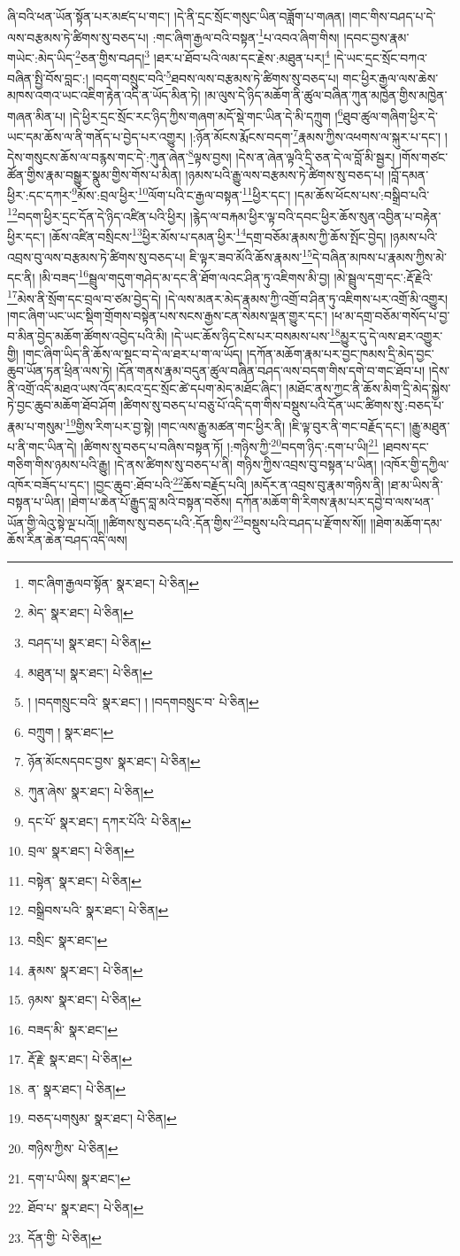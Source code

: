 ཞི་བའི་ཕན་ཡོན་སྟོན་པར་མཛད་པ་གང་། །དེ་ནི་དྲང་སྲོང་གསུང་ཡིན་བཟློག་པ་གཞན། །གང་གིས་བཤད་པ་དེ་ལས་བརྩམས་ཏེ་ཚིགས་སུ་བཅད་པ། :གང་ཞིག་རྒྱལ་བའི་བསྟན་\footnote{གང་ཞིག་རྒྱལབ་སྟོན་  སྣར་ཐང་།  པེ་ཅིན། }པ་འབའ་ཞིག་གིས། །དབང་བྱས་རྣམ་གཡེང་:མེད་ཡིད་\footnote{མེད་  སྣར་ཐང་།  པེ་ཅིན། }ཅན་གྱིས་བཤད།\footnote{བཤད་པ།  སྣར་ཐང་།  པེ་ཅིན། } །ཐར་པ་ཐོབ་པའི་ལམ་དང་རྗེས་:མཐུན་པར།\footnote{མཐུན་པ།  སྣར་ཐང་།  པེ་ཅིན། } །དེ་ཡང་དྲང་སྲོང་བཀའ་བཞིན་སྤྱི་བོས་བླང་:། །བདག་བསྲུང་བའི་\footnote{། །བདགསྲུང་བའི་  སྣར་ཐང་། ། །བདགབསྲུང་བ་  པེ་ཅིན། }ཐབས་ལས་བརྩམས་ཏེ་ཚིགས་སུ་བཅད་པ། གང་ཕྱིར་རྒྱལ་ལས་ཆེས་མཁས་འགའ་ཡང་འཇིག་རྟེན་འདི་ན་ཡོད་མིན་ཏེ། །མ་ལུས་དེ་ཉིད་མཆོག་ནི་ཚུལ་བཞིན་ཀུན་མཁྱེན་གྱིས་མཁྱེན་གཞན་མིན་པ། །དེ་ཕྱིར་དྲང་སྲོང་རང་ཉིད་ཀྱིས་གཞག་མདོ་སྡེ་གང་ཡིན་དེ་མི་དཀྲུག །\footnote{བཀྲུག །  སྣར་ཐང་། }ཐུབ་ཚུལ་གཞིག་ཕྱིར་དེ་ཡང་དམ་ཆོས་ལ་ནི་གནོད་པ་བྱེད་པར་འགྱུར། །:ཉོན་མོངས་རྨོངས་བདག་\footnote{ཉོན་མོངསདབང་བྱས་  སྣར་ཐང་།  པེ་ཅིན། }རྣམས་ཀྱིས་འཕགས་ལ་སྐུར་པ་དང་། །དེས་གསུངས་ཆོས་ལ་བརྙས་གང་དེ་:ཀུན་ཞེན་\footnote{ཀུན་ཞེས་  སྣར་ཐང་།  པེ་ཅིན། }ལྟས་བྱས། །དེས་ན་ཞེན་ལྟའི་དྲི་ཅན་དེ་ལ་བློ་མི་སྦྱར། །གོས་གཙང་ཚོན་གྱིས་རྣམ་བསྒྱུར་སྣུམ་གྱིས་གོས་པ་མིན། །ཉམས་པའི་རྒྱུ་ལས་བརྩམས་ཏེ་ཚིགས་སུ་བཅད་པ། །བློ་དམན་ཕྱིར་:དང་དཀར་\footnote{དང་པོ་  སྣར་ཐང་། དཀར་པོའི་  པེ་ཅིན། }མོས་:བྲལ་ཕྱིར་\footnote{བྲལ་  སྣར་ཐང་།  པེ་ཅིན། }ལོག་པའི་ང་རྒྱལ་བསྟན་\footnote{བསྟེན་  སྣར་ཐང་།  པེ་ཅིན། }ཕྱིར་དང་། །དམ་ཆོས་ཕོངས་པས་:བསྒྲིབ་པའི་\footnote{བསྒྲིབས་པའི་  སྣར་ཐང་།  པེ་ཅིན། }བདག་ཕྱིར་དྲང་དོན་དེ་ཉིད་འཛིན་པའི་ཕྱིར། །རྙེད་ལ་བརྐམ་ཕྱིར་ལྟ་བའི་དབང་ཕྱིར་ཆོས་སུན་འབྱིན་པ་བརྟེན་ཕྱིར་དང་། །ཆོས་འཛིན་བསྲིངས་\footnote{བསྲིང་  སྣར་ཐང་། }ཕྱིར་མོས་པ་དམན་ཕྱིར་\footnote{རྣམས་  སྣར་ཐང་།  པེ་ཅིན། }དགྲ་བཅོམ་རྣམས་ཀྱི་ཆོས་སྤོང་བྱེད། །ཉམས་པའི་འབྲས་བུ་ལས་བརྩམས་ཏེ་ཚིགས་སུ་བཅད་པ། ཇི་ལྟར་ཟབ་མོའི་ཆོས་རྣམས་\footnote{ཉམས་  སྣར་ཐང་།  པེ་ཅིན། }དེ་བཞིན་མཁས་པ་རྣམས་ཀྱིས་མེ་དང་ནི། །མི་བཟད་\footnote{བཟད་མི་  སྣར་ཐང་། }སྦྲུལ་གདུག་གཤེད་མ་དང་ནི་ཐོག་ལའང་ཤིན་ཏུ་འཇིགས་མི་བྱ། །མེ་སྦྲུལ་དགྲ་དང་:རྡོ་རྗེའི་\footnote{རྡོ་རྗེ་  སྣར་ཐང་།  པེ་ཅིན། }མེས་ནི་སྲོག་དང་བྲལ་བ་ཙམ་བྱེད་དེ། །དེ་ལས་མནར་མེད་རྣམས་ཀྱི་འགྲོ་བ་ཤིན་ཏུ་འཇིགས་པར་འགྲོ་མི་འགྱུར། །གང་ཞིག་ཡང་ཡང་སྡིག་གྲོགས་བསྟེན་པས་སངས་རྒྱས་ངན་སེམས་ལྡན་གྱུར་དང་། །ཕ་མ་དགྲ་བཅོམ་གསོད་པ་བྱ་བ་མིན་བྱེད་མཆོག་ཚོགས་འབྱེད་པའི་མི། །དེ་ཡང་ཆོས་ཉིད་ངེས་པར་བསམས་པས་\footnote{ན་  སྣར་ཐང་།  པེ་ཅིན། }མྱུར་དུ་དེ་ལས་ཐར་འགྱུར་གྱི། །གང་ཞིག་ཡིད་ནི་ཆོས་ལ་སྡང་བ་དེ་ལ་ཐར་པ་ག་ལ་ཡོད། །དཀོན་མཆོག་རྣམ་པར་བྱང་ཁམས་དྲི་མེད་བྱང་ཆུབ་ཡོན་ཏན་ཕྲིན་ལས་ཏེ། །དོན་གནས་རྣམ་བདུན་ཚུལ་བཞིན་བཤད་ལས་བདག་གིས་དགེ་བ་གང་ཐོབ་པ། །དེས་ནི་འགྲོ་འདི་མཐའ་ཡས་འོད་མངའ་དྲང་སྲོང་ཚེ་དཔག་མེད་མཐོང་ཞིང་། །མཐོང་ནས་ཀྱང་ནི་ཆོས་མིག་དྲི་མེད་སྐྱེས་ཏེ་བྱང་ཆུབ་མཆོག་ཐོབ་ཤོག །ཚིགས་སུ་བཅད་པ་བཅུ་པོ་འདི་དག་གིས་བསྡུས་པའི་དོན་ཡང་ཚིགས་སུ་:བཅད་པ་རྣམ་པ་གསུམ་\footnote{བཅད་པགསུམ་  སྣར་ཐང་།  པེ་ཅིན། }གྱིས་རིག་པར་བྱ་སྟེ། །གང་ལས་རྒྱུ་མཚན་གང་ཕྱིར་ནི། །ཇི་ལྟ་བུར་ནི་གང་བརྗོད་དང་། །རྒྱུ་མཐུན་པ་ནི་གང་ཡིན་དེ། །ཚིགས་སུ་བཅད་པ་བཞིས་བསྟན་ཏོ། །:གཉིས་ཀྱི་\footnote{གཉིས་ཀྱིས་  པེ་ཅིན། }བདག་ཉིད་:དག་པ་ཡི།\footnote{དག་པ་ཡིས།  སྣར་ཐང་། } །ཐབས་དང་གཅིག་གིས་ཉམས་པའི་རྒྱུ། །དེ་ནས་ཚིགས་སུ་བཅད་པ་ནི། གཉིས་ཀྱིས་འབྲས་བུ་བསྟན་པ་ཡིན། །འཁོར་གྱི་དཀྱིལ་འཁོར་བཟོད་པ་དང་། །བྱང་ཆུབ་:ཐོབ་པའི་\footnote{ཐོབ་པ་  སྣར་ཐང་།  པེ་ཅིན། }ཆོས་བརྗོད་པའི། །མདོར་ན་འབྲས་བུ་རྣམ་གཉིས་ནི། །ཐ་མ་ཡིས་ནི་བསྟན་པ་ཡིན། །ཐེག་པ་ཆེན་པོ་རྒྱུད་བླ་མའི་བསྟན་བཅོས། དཀོན་མཆོག་གི་རིགས་རྣམ་པར་དབྱེ་བ་ལས་ཕན་ཡོན་གྱི་ལེའུ་སྟེ་ལྔ་པའོ།། །།ཚིགས་སུ་བཅད་པའི་:དོན་གྱིས་\footnote{དོན་གྱི་  པེ་ཅིན། }བསྡུས་པའི་བཤད་པ་རྫོགས་སོ།། །།ཐེག་མཆོག་དམ་ཆོས་རིན་ཆེན་བཤད་འདི་ལས། 